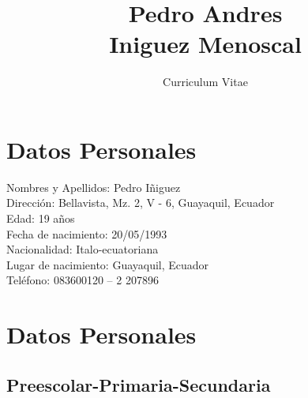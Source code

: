 \documentclass[10pt]{article}
\title{\bfseries\Huge Pedro Andres\\ Iniguez Menoscal}
\author{Curriculum Vitae}
\date{}
\begin{document}
\begin{minipage}{0.65\textwidth}
\begingroup
\let\center\flushleft
\let\endcenter\endflushleft
\maketitle
\endgroup
\end{minipage}
\begin{minipage}{0.3\textwidth}
\flushright{\rule{3.5cm}{4.5cm}}
\end{minipage}

\section{Datos Personales}
Nombres y Apellidos: Pedro Iñiguez\\
Dirección: Bellavista, Mz. 2, V - 6, Guayaquil, Ecuador \\
Edad: 19 años \\
Fecha de nacimiento: 20/05/1993\\
Nacionalidad: Italo-ecuatoriana\\
Lugar de nacimiento: Guayaquil, Ecuador\\
Teléfono: 083600120 – 2 207896\\
\section{Datos Personales}
\subsection{Preescolar-Primaria-Secundaria}
\end{document}
